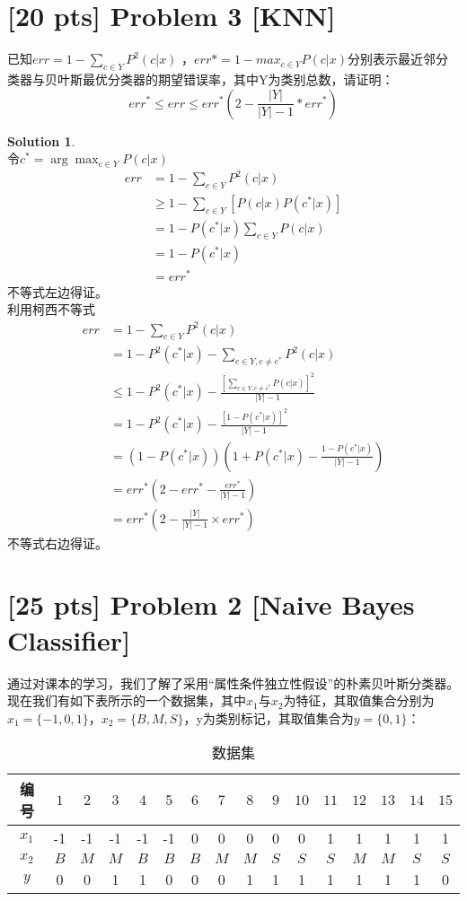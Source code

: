 \documentclass[a4paper,UTF8]{article}
\theoremstyle{definition}
\newtheorem*{solution}{Solution}
\begin{document}
\section*{[20 pts] Problem 3 [KNN]}
已知$err=1-\sum_{c \in Y}P^2(c|x)$
，$err*=1-max_{c \in Y}P(c|x)$分别表示最近邻分类器与贝叶斯最优分类器的期望错误率，其中Y为类别总数，请证明：\begin{equation*}err^* \leq err \leq err^*(2-\frac{|Y|}{|Y|-1}*err^*)\end{equation*}

\begin{solution}
	~\\
	令$c^*=\arg\max_{c \in Y}P(c|x)$
	\begin{align*}
		err&=1-\sum_{c \in Y}P^2(c|x)\\
		&\geq 1-\sum_{c \in Y}[P(c|x)P(c^*|x)]\\
		&=1-P(c^*|x)\sum_{c \in Y}P(c|x)\\
		&=1-P(c^*|x)\\
		&=err^*
	\end{align*}
	不等式左边得证。\\
	利用柯西不等式
	\begin{align*}
		err&=1-\sum_{c \in Y}P^2(c|x)\\
		&=1-P^2(c^*|x)-\sum_{c \in Y,c \neq c^*}P^2(c|x)\\
		&\leq 1-P^2(c^*|x)-\frac{[\sum_{c \in Y,c \neq c^*}P(c|x)]^2}{|Y|-1}\\
		&=1-P^2(c^*|x)-\frac{[1-P(c^*|x)]^2}{|Y|-1}\\
		&=(1-P(c^*|x))\left(1+P(c^*|x)-\frac{1-P(c^*|x)}{|Y|-1}\right)\\
		&=err^*(2-err^*-\frac{err^*}{|Y|-1})\\
		&=err^*(2-\frac{|Y|}{|Y|-1} \times err^*)
	\end{align*}
	不等式右边得证。
\end{solution}
\newpage

\section*
{[25 pts] Problem 2 [Naive Bayes Classifier]}
通过对课本的学习，我们了解了采用“属性条件独立性假设”的朴素贝叶斯分类器。现在我们有如下表所示的一个数据集，其中$x_1$与$x_2$为特征，其取值集合分别为$x_1=\{-1,0,1\}$，$x_2=\{B,M,S\}$，y为类别标记，其取值集合为$y=\{0,1\}$：
	\begin{table}[htp]
		\centering
		\caption{数据集}\label{tab:aStrangeTable}
	\begin{tabular}{cccccccccccccccc}
		\hline 
	编号	& $1$ & $2$ & $3$ & $4$ & $5$ & $6$ & $7$ & $8$ & $9$ & $10$ & $11$ & $12$ & $13$ & $14$ & $15$\\ 
		\hline 
	$x_1$	& -1 & -1 & -1 & -1 & -1 & 0 & 0 & 0 & 0 & 0 & 1 & 1 & 1 & 1 & 1 \\ 
		\hline 
	$x_2$	& $B$ &$M$ &$M$ &$B$ &$B$ &$B$ &$M$ &$M$ &$S$ &$S$ &$S$ &$M$ &$M$ &$S$ &$S$  \\ 
		\hline 
	$y$	& 0 & 0 & 1 & 1 & 0 & 0 & 0 & 1 & 1 & 1 & 1 & 1 & 1 & 1 & 0 \\ 
		\hline 
	\end{tabular}
	\end{table} 
	
\end{document}
